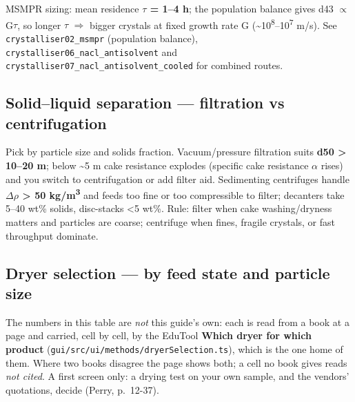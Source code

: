 \documentclass[11pt,a4paper]{article}
\begin{document}
MSMPR sizing: mean residence \textbf{\(\tau\) = 1--4 h}; the population balance
gives d43 \(\propto\) G\(\tau\), so longer \(\tau\) \(\Rightarrow\) bigger crystals at fixed growth rate G
(\textasciitilde10\textsuperscript{\textminus}\textsuperscript{8}--10\textsuperscript{\textminus}\textsuperscript{7} m/s). See \texttt{crystalliser02\_msmpr}
(population balance), \texttt{crystalliser06\_nacl\_antisolvent} and
\texttt{crystalliser07\_nacl\_antisolvent\_cooled} for combined routes.

\hypertarget{solidliquid-separation--filtration-vs-centrifugation}{%
\subsection{Solid--liquid separation --- filtration vs
centrifugation}\label{solidliquid-separation--filtration-vs-centrifugation}}

Pick by particle size and solids fraction. Vacuum/pressure filtration
suits \textbf{d50 \textgreater{} 10--20 \textmu{}m}; below \textasciitilde5 \textmu{}m
cake resistance explodes (specific cake resistance \(\alpha\) rises) and you
switch to centrifugation or add filter aid. Sedimenting centrifuges
handle \textbf{\(\Delta\)\(\rho\) \textgreater{} 50 kg/m\textsuperscript{3}} and feeds too fine or too
compressible to filter; decanters take 5--40 wt\% solids, disc-stacks
\textless5 wt\%. Rule: filter when cake washing/dryness matters and
particles are coarse; centrifuge when fines, fragile crystals, or fast
throughput dominate.

\hypertarget{dryer-selection--by-feed-state-and-particle-size}{%
\subsection{Dryer selection --- by feed state and particle
size}\label{dryer-selection--by-feed-state-and-particle-size}}

The numbers in this table are \emph{not} this guide's own: each is read from
a book at a page and carried, cell by cell, by the EduTool \textbf{Which dryer
for which product}
(\texttt{gui/src/ui/methods/dryerSelection.ts}), which is the one home of
them. Where two books disagree the page shows both; a cell no book gives
reads \emph{not cited}. A first screen only: a drying test on your own
sample, and the vendors' quotations, decide (Perry, p.~12-37).
\end{document}
